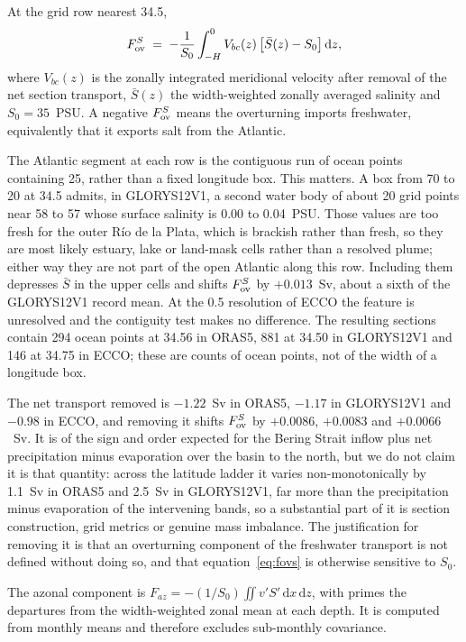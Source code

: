 At the grid row nearest 34.5\degS{},
\begin{equation}
F_{\mathrm{ov}}^{S} \;=\; -\frac{1}{S_0}\int_{-H}^{0} V_{bc}(z)\,\big[\bar{S}(z)-S_0\big]\,\mathrm{d}z,
\label{eq:fovs}
\end{equation}
where $V_{bc}(z)$ is the zonally integrated meridional velocity after removal of
the net section transport, $\bar{S}(z)$ the width-weighted zonally averaged
salinity and $S_0=35$~PSU. A negative $F_{\mathrm{ov}}^{S}$ means the overturning imports
freshwater, equivalently that it exports salt from the Atlantic.

The Atlantic segment at each row is the contiguous run of ocean points
containing 25\degW{}, rather than a fixed longitude box. This matters. A box
from 70\degW{} to 20\degE{} at 34.5\degS{} admits, in GLORYS12V1, a second water
body of about 20 grid points near 58 to 57\degW{} whose surface salinity is
0.00 to 0.04~PSU. Those values are too fresh for the outer R\'io de la Plata,
which is brackish rather than fresh, so they are most likely estuary, lake or
land-mask cells rather than a resolved plume; either way they are not part of the
open Atlantic along this row. Including them depresses $\bar{S}$ in the upper
cells and shifts $F_{\mathrm{ov}}^{S}$ by $+0.013$~Sv, about a sixth of the GLORYS12V1 record
mean. At the 0.5\degree{} resolution of ECCO the feature is unresolved and the
contiguity test makes no difference. The resulting sections contain 294 ocean
points at 34.56\degS{} in ORAS5, 881 at 34.50\degS{} in GLORYS12V1 and 146 at
34.75\degS{} in ECCO; these are counts of ocean points, not of the width of a
longitude box.

The net transport removed is $-1.22$~Sv in ORAS5, $-1.17$ in GLORYS12V1 and
$-0.98$ in ECCO, and removing it shifts $F_{\mathrm{ov}}^{S}$ by $+0.0086$, $+0.0083$ and
$+0.0066$~Sv. It is of the sign and order expected for the Bering Strait inflow
plus net precipitation minus evaporation over the basin to the north, but we do
not claim it is that quantity: across the latitude ladder it varies
non-monotonically by 1.1~Sv in ORAS5 and 2.5~Sv in GLORYS12V1, far more than the
precipitation minus evaporation of the intervening bands, so a substantial part
of it is section construction, grid metrics or genuine mass imbalance. The
justification for removing it is that an overturning component of the freshwater
transport is not defined without doing so, and that equation~\eqref{eq:fovs} is
otherwise sensitive to $S_0$.

The azonal component is
$F_{az}=-(1/S_0)\iint v'S'\,\mathrm{d}x\,\mathrm{d}z$, with primes the
departures from the width-weighted zonal mean at each depth. It is computed from
monthly means and therefore excludes sub-monthly covariance.

